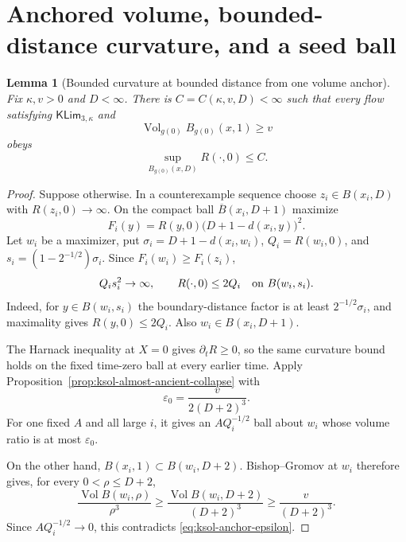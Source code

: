 \documentclass[10pt]{coll-l}
\newtheorem{lemma}[theorem]{Lemma}
\theoremstyle{definition}
\theoremstyle{remark}
\numberwithin{section}{chapter}
\numberwithin{equation}{chapter}
\newcommand{\Vol}{\operatorname{Vol}}
\begin{document}
\section{Anchored volume, bounded-distance curvature, and a seed ball}
\label{sec:ksol-anchored-control}

\begin{lemma}[Bounded curvature at bounded distance from one volume anchor]
\label{lem:ksol-bounded-curvature-bounded-distance}
Fix $\kappa,v>0$ and $D<\infty$.  There is
$C=C(\kappa,v,D)<\infty$ such that every flow satisfying
$\mathsf{KLim}_{3,\kappa}$ and
\begin{equation}
       \Vol_{g(0)}B_{g(0)}(x,1)\geq v                    \label{eq:ksol-anchor-data}
\end{equation}
obeys
\begin{equation}
                 \sup_{B_{g(0)}(x,D)}R(\cdot,0)\leq C. \label{eq:ksol-bounded-distance-bound}
\end{equation}
\end{lemma}

\begin{proof}
Suppose otherwise.  In a counterexample sequence choose
$z_i\in B(x_i,D)$ with $R(z_i,0)\to\infty$.  On the compact ball
$\overline B(x_i,D+1)$ maximize
\[
              F_i(y)=R(y,0)\bigl(D+1-d(x_i,y)\bigr)^2.
\]
Let $w_i$ be a maximizer, put
$\sigma_i=D+1-d(x_i,w_i)$,
$Q_i=R(w_i,0)$, and
$s_i=(1-2^{-1/2})\sigma_i$.  Since $F_i(w_i)\geq F_i(z_i)$,
\begin{equation}
 Q_is_i^2\to\infty,
 \qquad R(\cdot,0)\leq2Q_i\quad\hbox{on }B(w_i,s_i).    \label{eq:ksol-bounded-distance-pointpick}
\end{equation}
Indeed, for $y\in B(w_i,s_i)$ the boundary-distance factor is at least
$2^{-1/2}\sigma_i$, and maximality gives $R(y,0)\leq2Q_i$.
Also $w_i\in B(x_i,D+1)$.

The Harnack inequality at $X=0$ gives $\partial_tR\geq0$, so the same
curvature bound holds on the fixed time-zero ball at every earlier time.
Apply Proposition~\ref{prop:ksol-almost-ancient-collapse} with
\begin{equation}
                    \varepsilon_0=\frac{v}{2(D+2)^3}.   \label{eq:ksol-anchor-epsilon}
\end{equation}
For one fixed $A$ and all large $i$, it gives an $A Q_i^{-1/2}$ ball about
$w_i$ whose volume ratio is at most $\varepsilon_0$.

On the other hand, $B(x_i,1)\subset B(w_i,D+2)$.  Bishop--Gromov at $w_i$
therefore gives, for every $0<\rho\leq D+2$,
\begin{equation}
 \frac{\Vol B(w_i,\rho)}{\rho^3}
 \geq\frac{\Vol B(w_i,D+2)}{(D+2)^3}
 \geq\frac{v}{(D+2)^3}.                               \label{eq:ksol-anchor-BG-lower}
\end{equation}
Since $AQ_i^{-1/2}\to0$, this contradicts
\eqref{eq:ksol-anchor-epsilon}.
\end{proof}
\end{document}
